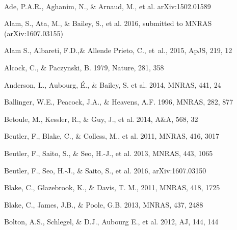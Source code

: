 \documentclass[iop]{emulateapj}
\begin{document}
\

\begin{thebibliography}{}

Ade, P.A.R., Aghanim, N., \& Arnaud, M., et al. arXiv:1502.01589

Alam, S., Ata, M., \& Bailey, S., et al. 2016,
submitted to MNRAS (arXiv:1607.03155)

{Alam} S., Albareti, F.D.,\& Allende Prieto, C., {et~al.}, 2015,  ApJS, 219, 12

Alcock, C., \& Paczynski, B. 1979, Nature, 281, 358  


Anderson, L., Aubourg, \'E., \& Bailey, S. et al. 2014, MNRAS, 441, 24  
  

Ballinger, W.E., Peacock, J.A., \& Heavens, A.F. 1996, MNRAS, 282, 877  

Betoule, M., Kessler, R., \& Guy, J., et al. 2014, A\&A, 568, 32


Beutler, F., Blake, C., \& Colless, M., et al. 2011, MNRAS, 416, 3017

Beutler, F., Saito, S., \& Seo, H.-J., et al. 2013, MNRAS, 443, 1065

Beutler, F., Seo, H.-J., \& Saito, S., et al. 2016,
arXiv:1607.03150

Blake, C., Glazebrook, K., \& Davis, T. M., 2011, MNRAS, 418, 1725  

Blake, C., James, J.B., \& Poole, G.B. 2013, MNRAS, 437, 2488

Bolton, A.S., Schlegel, \& D.J., Aubourg E., et al. 2012, AJ, 144, 144


\end{thebibliography}
\end{document}
